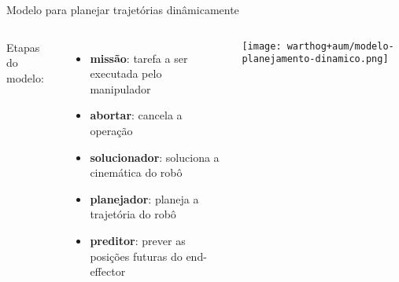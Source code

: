\begin{frame}[t]{Modelo para planejar trajetórias dinâmicamente} 
   
    \begin{columns}[c]

            Etapas do modelo:
            \begin{itemize}
                \item \textbf{missão}: tarefa a ser executada pelo manipulador
                \item \textbf{abortar}: cancela a operação
                \item \textbf{solucionador}: soluciona a cinemática do robô
                \item \textbf{planejador}:  planeja a trajetória do robô 
                \item \textbf{preditor}: prever as posições futuras do  end-effector
            \end{itemize}
            \texttt{[image: warthog+aum/modelo-planejamento-dinamico.png]}
    \end{columns}

\end{frame}

